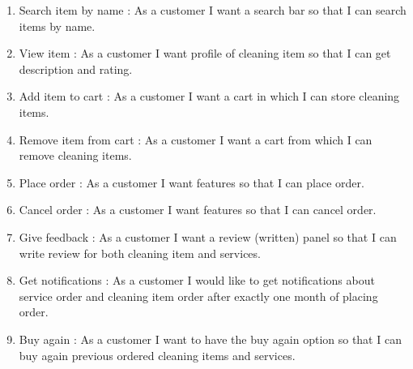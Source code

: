 \documentclass[conference]{IEEEtran}
\begin{document}
\begin{enumerate}
    \item Search item by name : As a customer I want a search bar so that I can search items by name.
    \item View item : As a customer I want profile of cleaning item so that I can get description and rating.
    \item Add item to cart : As a customer I want a cart in which I can store cleaning items.
    \item Remove item from cart : As a customer I want a cart from which I can remove cleaning items.
    \item Place order : As a customer I want features so that I can place order.
    \item Cancel order : As a customer I want features so that I can cancel order.
    
    \item Give feedback : As a customer I want a review (written) panel so that I can write review for both cleaning item and services.
    \item Get notifications : As a customer I would like to get notifications about service order and cleaning item order after exactly one month of placing order.
    \item Buy again : As a customer I want to have the buy again option so that I can buy again previous ordered cleaning items and services.
\end{enumerate}
    
\end{document}

